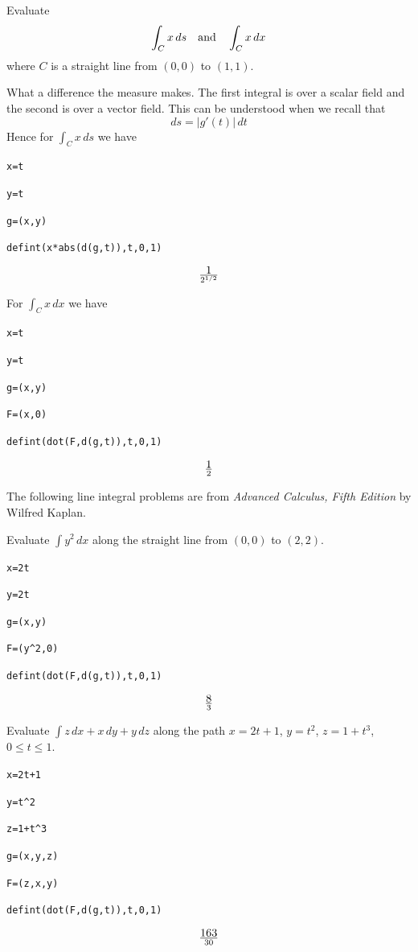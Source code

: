 \newpage

\noindent
Evaluate
$$\int_Cx\,ds\quad\hbox{and}\quad\int_Cx\,dx$$
where $C$ is a straight line from $(0,0)$ to $(1,1)$.

\medskip
\noindent
What a difference the measure makes.
The first integral is over a scalar field and the second is over a vector field.
This can be understood when we recall that
$$ds=|g'(t)|\,dt
$$
Hence for $\int_Cx\,ds$ we have

\medskip
\verb$x=t$

\verb$y=t$

\verb$g=(x,y)$

\verb$defint(x*abs(d(g,t)),t,0,1)$

$$1\over2^{1/2}$$

\medskip
\noindent
For $\int_Cx\,dx$ we have

\medskip
\verb$x=t$

\verb$y=t$

\verb$g=(x,y)$

\verb$F=(x,0)$

\verb$defint(dot(F,d(g,t)),t,0,1)$

$$1\over2$$

\newpage

\noindent
The following line integral problems are from
{\it Advanced Calculus, Fifth Edition} by Wilfred Kaplan.

\medskip
\noindent
Evaluate $\int y^2\,dx$ along the straight
line from $(0,0)$ to $(2,2)$.

\medskip
\verb$x=2t$

\verb$y=2t$

\verb$g=(x,y)$

\verb$F=(y^2,0)$

\verb$defint(dot(F,d(g,t)),t,0,1)$

$$8\over3$$

\medskip
\noindent
Evaluate $\int z\,dx+x\,dy+y\,dz$
along the path
$x=2t+1$, $y=t^2$, $z=1+t^3$, $0\le t\le 1$.

\medskip
\verb$x=2t+1$

\verb$y=t^2$

\verb$z=1+t^3$

\verb$g=(x,y,z)$

\verb$F=(z,x,y)$

\verb$defint(dot(F,d(g,t)),t,0,1)$

$$163\over30$$

